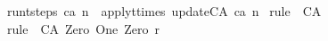 \begin{isabellebody}
{\isachardoublequoteopen}run{\isacharunderscore}t{\isacharunderscore}steps\ ca\ n\ {\isacharequal}\ apply{\isacharunderscore}t{\isacharunderscore}times\ update{\isacharunderscore}CA\ ca\ n{\isachardoublequoteclose}%
\isadelimdocument
%
\endisadelimdocument
%
\isatagdocument
%
\isamarkuptrue%
%
\endisatagdocument
{\isafolddocument}%
%
\isadelimdocument
%
\endisadelimdocument
{}\isamarkupfalse%
\ rule{}{}{}\ {\isacharcolon}{\isacharcolon}\ CA\ \isanewline
{\isachardoublequoteopen}rule{}{}{}\ {\isasymequiv}\ CA\ {\isacharbrackleft}Zero{\isacharcomma}\ One{\isacharcomma}\ Zero{\isacharbrackright}\ r{}{}{}{\isachardoublequoteclose}\isanewline
%
\isadelimtheory
%
\endisadelimtheory
%
\isatagtheory
{}\isamarkupfalse%
%
\endisatagtheory
{\isafoldtheory}%
%
\isadelimtheory
%
\endisadelimtheory
%
\end{isabellebody}%
\endinput
